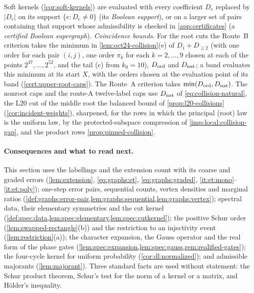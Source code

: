 Soft kernels (\cref{cor:soft-kernels}) are evaluated with every
coefficient $D_e$ replaced by $|D_e|$ on its support
$\{e:D_e\ne0\}$ (its \emph{Boolean support}), or on a larger set
of pairs containing that support whose admissibility is checked
in \cref{app:certificates} (a \emph{certified Boolean
supergraph}).
\emph{Coincidence bounds.} For the root cuts the Route~B criterion takes
the minimum in \cref{lem:oct24-collision}(e) of $D_1+D_{\ge2}$ (with one order for
each pair $(i,j)$, one order $\pi_k$ for each $k=2,\dots,9$ chosen at each of the
points $2^{47},\dots,2^{52}$, and the tail (c) from $k_0=10$), $D_{\rm ord}$ and
$D_{\rm nat}$; a band evaluates this minimum at its start $X$, with the orders chosen
at the evaluation point of its band (\cref{cert:upper-root-caps}). The Route~A criterion takes
$\min(D_{\rm ord},D_{\rm nat})$. The nonroot caps and the route-A twelve-label caps use
$D_{\rm nat}$ of \eqref{eq:collision-natural}, the L20 cut of the middle root the
balanced bound of \cref{prop:l20-collisions} (\cref{cor:incident-weights}),
sharpened, for the rows in which the principal (root) law is the
uniform law, by the protected-subspace compression of
\cref{imp:local:collision-gap}, and the
product rows \cref{prop:pinned-collision}.

\paragraph{Consequences and what to read next.}
This section uses the labellings and the extension count with its coarse
and graded errors
(\cref{lem:extension}, \eqref{eq:graphs:et}, \eqref{eq:graphs:graded},
\ref{it:et:mono}--\ref{it:et:poly}); one-step error pairs, sequential counts, vertex
densities and marginal ratios
(\cref{def:graphs:error-pair,lem:graphs:sequential,lem:graphs:vertex}); spectral data,
their elementary symmetries and the cut kernel
(\cref{def:spec:data,lem:spec:elementary,lem:spec:cutkernel}); the positive Schur
order (\cref{lem:swapped-rectangle}(b)) and the restriction to an injectivity event
(\cref{lem:restriction}(a)); the character expansion, the Gauss operator and the real
form of the phase gates (\cref{lem:spec:expansion,lem:spec:gauss,rem:realified-gates}); the
four-cycle kernel for uniform probability (\cref{cor:dl:normalized}); and admissible
majorants (\cref{lem:majorant}). Three standard facts are used without statement: the
Schur product theorem, Schur's test for the norm of a kernel or a matrix, and
H\"older's inequality.
